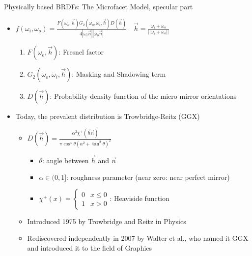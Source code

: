 \documentclass[utf8,stillsansserifmath,fleqn,t]{beamer}
\newcommand{\ds}{\displaystyle}
\begin{document}
\begin{frame}[label=materials-microfacet-ggx]
\frametitle{\insertsection}
Physically based BRDFs: The Microfacet Model, specular part
\begin{itemize}
\item $\ds f(\omega_i,\omega_o) =
\frac{F(\omega_o,\vec{h})G_2(\omega_o,\omega_i,\vec{h})D(\vec{h})}{4|\omega_i\vec{n}||\omega_o\vec{n}|}\quad \vec{h}=\frac{\omega_i+\omega_o}{||\omega_i+\omega_o||}$
\begin{enumerate}
\item $F(\omega_o,\vec{h})$: Fresnel factor
\item $G_2(\omega_o,\omega_i,\vec{h})$: Masking and Shadowing term
\item $D(\vec{h})$: Probability density function of the micro mirror orientations
\end{enumerate}
\item Today, the prevalent distribution is Trowbridge-Reitz (GGX)
    \begin{itemize}
    \item $\ds D(\vec{h}) = \frac{\alpha^2\chi^{+}(\vec{h}\vec{n})}{\pi\cos^4\theta(\alpha^2+\tan^2\theta)^2}$
    \begin{itemize}
    \item $\theta$: angle between $\vec{h}$ and $\vec{n}$
    \item $\alpha \in (0,1]$: roughness parameter (near zero: near perfect mirror)
    \item $\chi^{+}(x)=\begin{cases}0&x\leq0\\1&x>0\end{cases}$: Heaviside function
    \end{itemize}
    \item Introduced 1975 by Trowbridge and Reitz in Physics
    \item Rediscovered independently in 2007 by Walter et al., who named it GGX and introduced it to the field of Graphics
    \end{itemize}
\end{itemize}
\end{frame}
\end{document}
